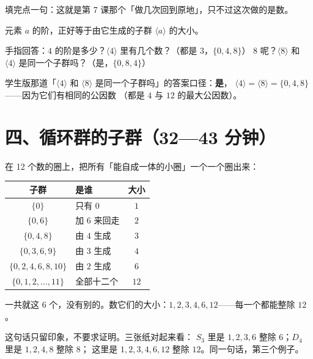 填完点一句：这就是第 7 课那个「做几次回到原地」，只不过这次做的是数。

\begin{dingli}[阶与生成子群]
  元素 \(a\) 的阶，正好等于由它生成的子群 \(\langle a\rangle\) 的大小。
\end{dingli}

\begin{caozuo}
  手指回答：\(4\) 的阶是多少？\(\langle4\rangle\) 里有几个数？（都是 \(3\)，\(\{0,4,8\}\)）
  \(8\) 呢？\(\langle8\rangle\) 和 \(\langle4\rangle\) 是同一个子群吗？（是，\(\{0,8,4\}\)）
\end{caozuo}

\begin{zhu}
  学生版那道「\(\langle4\rangle\) 和 \(\langle8\rangle\) 是同一个子群吗」的答案口径：\textbf{是}，
  \(\langle4\rangle=\langle8\rangle=\{0,4,8\}\)——因为它们有相同的公因数
  （都是 \(4\) 与 \(12\) 的最大公因数）。
\end{zhu}

\section*{四、循环群的子群（32—43 分钟）}

在 12 个数的圈上，把所有「能自成一体的小圈」一个一个圈出来：

\begin{center}
\begin{tabular}{@{}clc@{}}
  \toprule
  子群 & 是谁 & 大小 \\
  \midrule
  \(\{0\}\) & 只有 \(0\) & \(1\) \\
  \(\{0,6\}\) & 加 \(6\) 来回走 & \(2\) \\
  \(\{0,4,8\}\) & 由 \(4\) 生成 & \(3\) \\
  \(\{0,3,6,9\}\) & 由 \(3\) 生成 & \(4\) \\
  \(\{0,2,4,6,8,10\}\) & 由 \(2\) 生成 & \(6\) \\
  \(\{0,1,2,\dots,11\}\) & 全部十二个 & \(12\) \\
  \bottomrule
\end{tabular}
\end{center}

一共就这 \(6\) 个，没有别的。数它们的大小：\(1,2,3,4,6,12\)——每一个都能整除 \(12\)。

\begin{zhu}
  这句话只留印象，不要求证明。三张纸对起来看：
  \(S_3\) 里是 \(1,2,3,6\) 整除 \(6\)；\(D_4\) 里是 \(1,2,4,8\) 整除 \(8\)；
  这里是 \(1,2,3,4,6,12\) 整除 \(12\)。同一句话，第三个例子。
\end{zhu}

